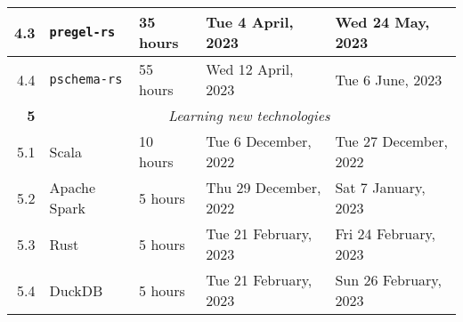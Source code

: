 \documentclass{standalone}
\begin{document}
\begin{tabular}{|r|llll|}
    4.3                                                           & \multicolumn{1}{l|}{\texttt{pregel-rs}}                         & \multicolumn{1}{l|}{35 hours}                                  & \multicolumn{1}{l|}{Tue 4 April, 2023}                      & Wed 24 May, 2023                                             \\ \hline
    4.4                                                           & \multicolumn{1}{l|}{\texttt{pschema-rs}}                        & \multicolumn{1}{l|}{55 hours}                                  & \multicolumn{1}{l|}{Wed 12 April, 2023}                     & Tue 6 June, 2023                                             \\ \hline
    \textbf{5}                                                    & \multicolumn{4}{c|}{\textit{Learning new technologies}}                                                                                                                                                                                                       \\ \hline
    5.1                                                           & \multicolumn{1}{l|}{Scala}                                      & \multicolumn{1}{l|}{10 hours}                                  & \multicolumn{1}{l|}{Tue 6 December, 2022}                   & Tue 27 December, 2022                                        \\ \hline
    5.2                                                           & \multicolumn{1}{l|}{Apache Spark}                               & \multicolumn{1}{l|}{5 hours}                                   & \multicolumn{1}{l|}{Thu 29 December, 2022}                  & Sat 7 January, 2023                                          \\ \hline
    5.3                                                           & \multicolumn{1}{l|}{Rust}                                       & \multicolumn{1}{l|}{5 hours}                                   & \multicolumn{1}{l|}{Tue 21 February, 2023}                  & Fri 24 February, 2023                                        \\ \hline
    5.4                                                           & \multicolumn{1}{l|}{DuckDB}                                     & \multicolumn{1}{l|}{5 hours}                                   & \multicolumn{1}{l|}{Tue 21 February, 2023}                  & Sun 26 February, 2023                                        \\ \hline

\end{tabular}
\end{document}

